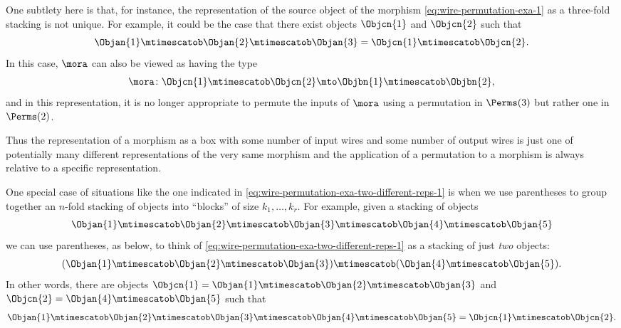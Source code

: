 One subtlety here is that, for instance, the representation of the source object of the morphism \cref{eq:wire-permutation-exa-1} as a three-fold stacking is not unique. For example, it could be the case that there exist objects $\Objcn{1}$ and $\Objcn{2}$ such that 
\begin{equation}\label{eq:wire-permutation-exa-two-different-reps-1}
\Objan{1} \mtimescatob \Objan{2}  \mtimescatob \Objan{3} = \Objcn{1} \mtimescatob \Objcn{2}. 
\end{equation}
In this case, $\mora$ can also be viewed as having the type
\begin{equation}
\mora \colon \Objcn{1} \mtimescatob \Objcn{2} \mto \Objbn{1} \mtimescatob \Objbn{2}, 
\end{equation}
and in this representation, it is no longer appropriate to permute the inputs of $\mora$ using a permutation in $\Perms(3)$ but rather one in $\Perms(2)$. 

Thus the representation of a morphism as a box with some number of input wires and some number of output wires is just one of potentially many different representations of the very same morphism and the application of a permutation to a morphism is always relative to a specific representation. 

One special case of situations like the one indicated in \cref{eq:wire-permutation-exa-two-different-reps-1} is when we use parentheses to group together an $n$-fold stacking of objects into ``blocks'' of size $k_1, \dots, k_r$. For example, given a stacking of objects
\begin{equation}\label{eq:wire-permutation-exa-two-different-reps-2}
\Objan{1} \mtimescatob \Objan{2}  \mtimescatob \Objan{3} \mtimescatob \Objan{4} \mtimescatob \Objan{5}
\end{equation}
we can use parentheses, as below, to think of \cref{eq:wire-permutation-exa-two-different-reps-1} as a stacking of just \emph{two} objects:
\begin{equation}\label{eq:wire-permutation-exa-two-different-reps-3}
(\Objan{1} \mtimescatob \Objan{2}  \mtimescatob \Objan{3}) \mtimescatob (\Objan{4} \mtimescatob \Objan{5}).
\end{equation}
In other words, there are objects $\Objcn{1} = \Objan{1} \mtimescatob \Objan{2}  \mtimescatob \Objan{3}$ and $\Objcn{2} = \Objan{4} \mtimescatob \Objan{5}$ such that 
\begin{equation}
\Objan{1} \mtimescatob \Objan{2}  \mtimescatob \Objan{3} \mtimescatob \Objan{4} \mtimescatob \Objan{5} = \Objcn{1} \mtimescatob \Objcn{2}. 
\end{equation}

